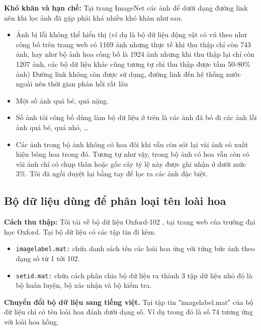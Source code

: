 \documentclass[12pt]{report}
\begin{document}
								
		\textbf{Khó khăn và hạn chế:} Tại trang ImageNet các ảnh để dưới dạng đường link nên khi lọc ảnh đã gặp phải khá nhiều khó khăn như sau.
		\begin{itemize}
			\item Ảnh bị lỗi không thể hiển thị (ví dụ là bộ dữ liệu động vật có vú theo như công bố trên trang web có 1169 ảnh nhưng thực tế khi thu thập chỉ còn 743 ảnh, hay như bộ ảnh hoa công bố là 1924 ảnh nhưng khi thu thập lại chỉ còn 1207 ảnh, các bộ dữ liệu khác cũng tương tự chỉ thu thập được tầm 50-80\% ảnh) Đường link không còn được sử dụng, đường link đến hệ thống nước ngoài nên thời gian phản hồi rất lâu
			\item Một số ảnh quá bé, quá nặng.
			\item Số ảnh tôi công bố dùng làm bộ dữ liệu ở trên là các ảnh đã bỏ đi các ảnh lỗi ảnh quá bé, quá nhỏ, …
			\item Các ảnh trong bộ ảnh không có hoa đôi khi vẫn còn sót lại vài ảnh có xuất hiện bông hoa trong đó. Tương tự như vậy, trong bộ ảnh có hoa vẫn còn có vài ảnh chỉ có chụp thân hoặc gốc cây tỷ lệ này được ghi nhận ở dưới mức 3\%. 
			Tôi đã ngồi duyệt lại bằng tay để lọc ra các ảnh đặc biệt.
		\end{itemize}
								
									
		\subsection{Bộ dữ liệu dùng để phân loại tên loài hoa}
										
		\textbf{Cách thu thập:} Tôi tải về bộ dữ liệu Oxford-102 \cite{cia-Nilsback06}, tại trang web của trường đại học Oxford. Tại bộ dữ liệu có các tập tin đi kèm.
		\begin{itemize}
			\item \texttt{imagelabel.mat:} chứa danh sách tên các loài hoa ứng với từng bức ảnh theo dạng số từ 1 tới 102.
			\item \texttt{setid.mat:} chứa cách phân chia bộ dữ liệu ra thành 3 tập dữ liệu nhỏ đó là bộ huấn luyện, bộ xác nhận và bộ kiểm tra.
		\end{itemize}
								
		\textbf{Chuyển đổi bộ dữ liệu sang tiếng việt.}
		Tại tập tin "imagelabel.mat" của bộ dữ liệu chỉ có tên loài hoa đánh dưới dạng số. Ví dụ trong đó là số 74 tương ứng với loài hoa hồng.
								
\end{document}

